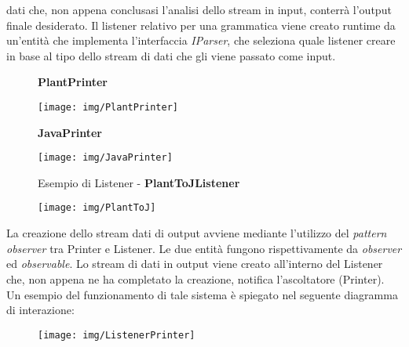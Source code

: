 \documentclass{article}
\begin{document}
  dati che, non appena conclusasi l'analisi dello stream in input, conterrà l'output finale desiderato. Il listener relativo per una grammatica viene creato runtime
  da un'entità che implementa l'interfaccia \textit{IParser}, che seleziona quale listener creare in base al tipo dello stream di dati che gli viene passato
  come input.
  \begin{figure}[H]
    \centering
    \begin{framed}
      \textbf{PlantPrinter}\par\medskip
      \texttt{[image: img/PlantPrinter]}
    \end{framed}
  \end{figure}
  \begin{figure}[H]
    \centering
    \begin{framed}
      \textbf{JavaPrinter}\par\medskip
      \texttt{[image: img/JavaPrinter]}
    \end{framed}
  \end{figure}
  \begin{figure}[H]
    \centering
    \begin{framed}
      Esempio di Listener - \textbf{PlantToJListener}\par\medskip
      \texttt{[image: img/PlantToJ]}
    \end{framed}
  \end{figure}
  La creazione dello stream dati di output avviene mediante l'utilizzo del \textit{pattern observer} tra Printer e Listener. Le due entità fungono rispettivamente da
  \textit{observer} ed \textit{observable}. Lo stream di dati in output viene creato all'interno del Listener che, non appena ne ha completato la creazione,
  notifica l'ascoltatore (Printer).\\
  Un esempio del funzionamento di tale sistema è spiegato nel seguente diagramma di interazione:
  \begin{figure}[H]
    \centering
    \begin{framed}
      \texttt{[image: img/ListenerPrinter]}
    \end{framed}
  \end{figure}
\end{document}
